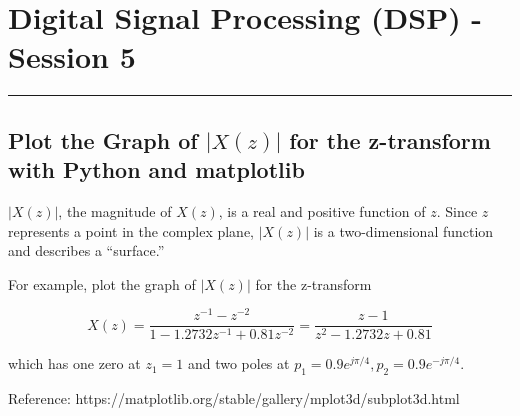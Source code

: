 \hypertarget{digital-signal-processing-dsp---session-5}{%
\section{Digital Signal Processing (DSP) - Session
5}\label{digital-signal-processing-dsp---session-5}}

\begin{center}\rule{0.5\linewidth}{0.5pt}\end{center}

\hypertarget{plot-the-graph-of-xz-for-the-z-transform-with-python-and-matplotlib}{%
\subsection{\texorpdfstring{Plot the Graph of \(|X(z)|\) for the
z-transform with Python and
matplotlib}{Plot the Graph of \textbar X(z)\textbar{} for the z-transform with Python and matplotlib}}\label{plot-the-graph-of-xz-for-the-z-transform-with-python-and-matplotlib}}

\(|X(z)|\), the magnitude of \(X(z)\), is a real and positive function
of \(z\). Since \(z\) represents a point in the complex plane,
\(|X(z)|\) is a two-dimensional function and describes a ``surface.''

For example, plot the graph of \(|X(z)|\) for the z-transform

\[
X(z) = \frac{z^{-1} - z^{-2}}{1 - 1.2732z^{-1} + 0.81z^{-2}}
= \frac{z - 1}{z^2 - 1.2732z + 0.81}
\]

which has one zero at \(z_1 = 1\) and two poles at
\(p_1 = 0.9e^{j π/4}, p_2 = 0.9e^{-j π/4}\).

Reference: https://matplotlib.org/stable/gallery/mplot3d/subplot3d.html

